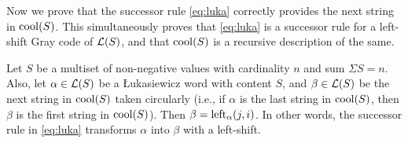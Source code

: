 Now we prove that the successor rule \eqref{eq:luka} correctly provides the next string in $\cool{S}$.
This simultaneously proves that \eqref{eq:luka} is a successor rule for a left-shift Gray code of $\Lukas{S}$, and that $\cool{S}$ is a recursive description of the same.

\begin{theorem}
\label{thm:equal}
Let $S$ be a multiset of non-negative values with cardinality $n$ and sum $\Sigma S = n$.
Also, let $\alpha \in \Lukas{S}$ be a Łukasiewicz word with content $S$, and $\beta \in \Lukas{S}$ be the next string in $\cool{S}$ taken circularly (i.e., if $\alpha$ is the last string in $\cool{S}$, then $\beta$ is the first string in $\cool{S}$).
Then $\beta = \leftshift[\alpha]{j}{i}$.
In other words, the successor rule in \eqref{eq:luka} transforms $\alpha$ into $\beta$ with a left-shift.
\end{theorem}
